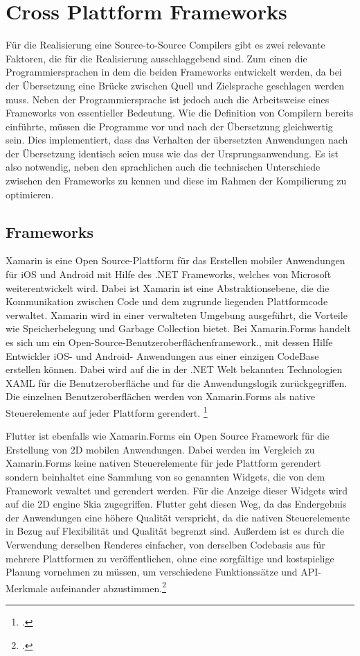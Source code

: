 \chapter{Cross Plattform Frameworks}
\label{chap:CrossPlattformFrameworks}

Für die Realisierung eine Source-to-Source Compilers gibt es zwei relevante Faktoren,  die für die Realisierung ausschlaggebend sind.  Zum einen die Programmiersprachen in dem die beiden Frameworks entwickelt werden,  da bei der Übersetzung eine Brücke zwischen Quell und Zielsprache geschlagen werden muss.  Neben der Programmiersprache ist jedoch auch die Arbeitsweise eines Frameworks von essentieller Bedeutung.  Wie die Definition von Compilern bereits einführte,  müssen die Programme vor und nach der Übersetzung gleichwertig sein.  Dies implementiert,  dass das Verhalten der übersetzten Anwendungen nach der Übersetzung identisch seien muss wie das der Ursprungsanwendung.  Es ist also notwendig,  neben den sprachlichen auch die technischen Unterschiede zwischen den Frameworks zu kennen und diese im Rahmen der Kompilierung zu optimieren. 

\section{Frameworks}
Xamarin is eine Open Source-Plattform für das Erstellen mobiler Anwendungen für iOS und Android mit Hilfe des .NET Frameworks, welches von Microsoft weiterentwickelt wird.  Dabei ist Xamarin ist eine Abstraktionsebene, die die Kommunikation zwischen Code und dem zugrunde liegenden Plattformcode verwaltet.  Xamarin wird in einer verwalteten Umgebung ausgeführt, die Vorteile wie Speicherbelegung und Garbage Collection bietet.  Bei Xamarin.Forms handelt es sich um ein Open-Source-Benutzeroberflächenframework., mit dessen Hilfe Entwickler iOS- und Android- Anwendungen aus einer einzigen CodeBase erstellen können.  Dabei wird auf die in der .NET Welt bekannten Technologien XAML  für die Benutzeroberfläche und \Csharp für die Anwendungslogik zurückgegriffen.  Die einzelnen Benutzeroberflächen werden von Xamarin.Forms als native Steuerelemente auf jeder Plattform gerendert.  \footcite[Vgl.][Abgerufen am \today]{MicrosoftWhatIsXam2020}

Flutter ist ebenfalls wie Xamarin.Forms ein Open Source Framework für die Erstellung von 2D mobilen Anwendungen.  Dabei werden im Vergleich zu Xamarin.Forms keine nativen Steuerelemente für jede Plattform gerendert sondern beinhaltet eine Sammlung von so genannten Widgets, die von dem Framework vewaltet und gerendert werden.  Für die Anzeige dieser Widgets wird auf die 2D engine Skia zugegriffen.  Flutter geht diesen Weg,  da das Endergebnis der Anwendungen eine höhere Qualität verspricht, da die nativen Steuerelemente in Bezug auf Flexibilität und Qualität begrenzt sind.  Außerdem ist es durch die Verwendung derselben Renderes einfacher, von derselben Codebasis aus für mehrere Plattformen zu veröffentlichen,  ohne eine sorgfältige und kostspielige Planung vornehmen zu müssen,  um verschiedene Funktionssätze und API-Merkmale aufeinander abzustimmen.\footcite[Vgl.][Abgerufen am \today]{GoogleFlutterFAQ2020}

